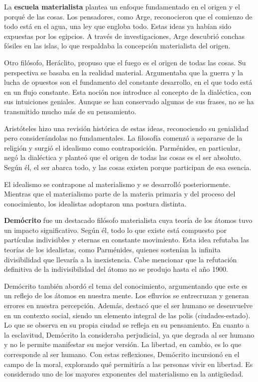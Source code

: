 \documentclass[
  letterpaper,
  DIV=11,
  numbers=noendperiod]{scrartcl}
\begin{document}
La \textbf{escuela materialista} plantea un enfoque fundamentado en el
origen y el porqué de las cosas. Los pensadores, como Arge, reconocieron
que el comienzo de todo está en el agua, una ley que engloba todo. Estas
ideas ya habían sido expuestas por los egipcios. A través de
investigaciones, Arge descubrió conchas fósiles en las islas, lo que
respaldaba la concepción materialista del origen.

Otro filósofo, Heráclito, propuso que el fuego es el origen de todas las
cosas. Su perspectiva se basaba en la realidad material. Argumentaba que
la guerra y la lucha de opuestos son el fundamento del constante
desarrollo, en el que todo está en un flujo constante. Esta noción nos
introduce al concepto de la dialéctica, con sus intuiciones geniales.
Aunque se han conservado algunas de sus frases, no se ha transmitido
mucho más de su pensamiento.

Aristóteles hizo una revisión histórica de estas ideas, reconociendo su
genialidad pero considerándolas no fundamentales. La filosofía comenzó a
separarse de la religión y surgió el idealismo como contraposición.
Parménides, en particular, negó la dialéctica y planteó que el origen de
todas las cosas es el ser absoluto. Según él, el ser abarca todo, y las
cosas existen porque participan de esa esencia.

El idealismo se contrapone al materialismo y se desarrolló
posteriormente. Mientras que el materialismo parte de la materia
primaria y del proceso del conocimiento, los idealistas adoptaron una
postura distinta.

\textbf{Demócrito} fue un destacado filósofo materialista cuya teoría de
los átomos tuvo un impacto significativo. Según él, todo lo que existe
está compuesto por partículas indivisibles y eternas en constante
movimiento. Esta idea refutaba las teorías de los idealistas, como
Parménides, quienes sostenían la infinita divisibilidad que llevaría a
la inexistencia. Cabe mencionar que la refutación definitiva de la
indivisibilidad del átomo no se produjo hasta el año 1900.

Demócrito también abordó el tema del conocimiento, argumentando que este
es un reflejo de los átomos en nuestra mente. Los efluvios se
entrecruzan y generan errores en nuestra percepción. Además, destacó que
el ser humano se desenvuelve en un contexto social, siendo un elemento
integral de las polis (ciudades-estado). Lo que se observa en su propia
ciudad se refleja en su pensamiento. En cuanto a la esclavitud,
Demócrito la consideraba perjudicial, ya que degrada al ser humano y no
le permite manifestar su mejor versión. La libertad, en cambio, es lo
que corresponde al ser humano. Con estas reflexiones, Demócrito
incursionó en el campo de la moral, explorando qué permitiría a las
personas vivir en libertad. Es considerado uno de los mayores exponentes
del materialismo en la antigüedad.
\end{document}
